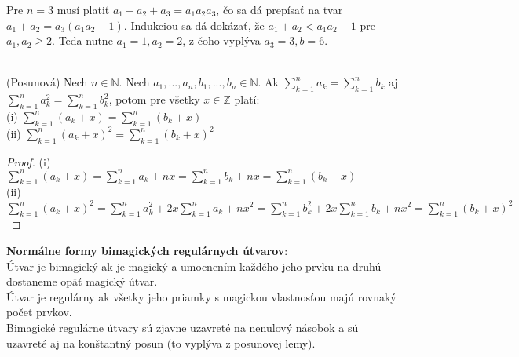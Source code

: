 Pre $n = 3$ musí platiť $a_1 + a_2 + a_3 = a_1 a_2 a_3$, čo sa dá prepísať na tvar $a_1 + a_2 = a_3 (a_1 a_2 - 1)$. Indukciou sa dá dokázať, že $a_1 + a_2 < a_1 a_2 - 1$ pre $a_1, a_2 \geq 2$. Teda nutne $a_1 = 1, a_2 = 2$, z čoho vyplýva $a_3 = 3, b = 6$. \\\\

\begin{lemma} (Posunová) Nech $n \in \mathbb{N}$. Nech $a_1, ... , a_n, b_1, ... , b_n \in \mathbb{N}$. Ak $\sum_{k=1}^{n} a_k = \sum_{k=1}^{n} b_k$ aj $\sum_{k=1}^{n} a^2_k = \sum_{k=1}^{n} b^2_k$, potom pre všetky $x \in \mathbb{Z}$ platí: \\
(i) $\sum_{k=1}^{n} (a_k + x) = \sum_{k=1}^{n} (b_k + x)$ \\
(ii) $\sum_{k=1}^{n} (a_k + x)^2 = \sum_{k=1}^{n} (b_k + x)^2$
\end{lemma}
 
\begin{proof} (i) $\sum_{k=1}^{n} (a_k + x) = \sum_{k=1}^{n} a_k + nx = \sum_{k=1}^{n} b_k + nx = \sum_{k=1}^{n} (b_k + x)$ \\
(ii) $\sum_{k=1}^{n} (a_k + x)^2 = \sum_{k=1}^{n} a^2_k + 2x \sum_{k=1}^{n} a_k + nx^2 = \sum_{k=1}^{n} b^2_k + 2x \sum_{k=1}^{n} b_k + nx^2 = \sum_{k=1}^{n} (b_k + x)^2$
\end{proof}

\textbf{Normálne formy bimagických regulárnych útvarov}: \\

Útvar je bimagický ak je magický a umocnením každého jeho prvku na druhú dostaneme opäť magický útvar. \\

Útvar je regulárny ak všetky jeho priamky s magickou vlastnosťou majú rovnaký počet prvkov. \\

Bimagické regulárne útvary sú zjavne uzavreté na nenulový násobok a sú uzavreté aj na konštantný posun (to vyplýva z posunovej lemy). \\

